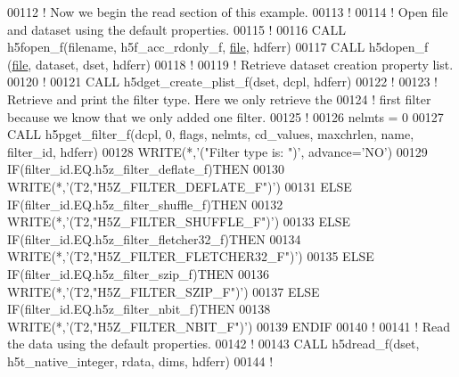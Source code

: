 \begin{DoxyCode}
00112   \textcolor{comment}{! Now we begin the read section of this example.}
00113   \textcolor{comment}{!}
00114   \textcolor{comment}{! Open file and dataset using the default properties.}
00115   \textcolor{comment}{!}
00116   \textcolor{keyword}{CALL }h5fopen\_f(filename, h5f\_acc\_rdonly\_f, \hyperlink{structfile}{file}, hdferr)
00117   \textcolor{keyword}{CALL }h5dopen\_f (\hyperlink{structfile}{file}, dataset, dset, hdferr)
00118   \textcolor{comment}{!}
00119   \textcolor{comment}{! Retrieve dataset creation property list.}
00120   \textcolor{comment}{!}
00121   \textcolor{keyword}{CALL }h5dget\_create\_plist\_f(dset, dcpl, hdferr)
00122   \textcolor{comment}{!}
00123   \textcolor{comment}{! Retrieve and print the filter type.  Here we only retrieve the}
00124   \textcolor{comment}{! first filter because we know that we only added one filter.}
00125   \textcolor{comment}{!}
00126   nelmts = 0
00127   \textcolor{keyword}{CALL }h5pget\_filter\_f(dcpl, 0, flags, nelmts, cd\_values, maxchrlen, name, filter\_id, hdferr)
00128   \textcolor{keyword}{WRITE}(*,\textcolor{stringliteral}{'("Filter type is: ")'}, advance=\textcolor{stringliteral}{'NO'})
00129   \textcolor{keywordflow}{IF}(filter\_id.EQ.h5z\_filter\_deflate\_f)\textcolor{keywordflow}{THEN}
00130      \textcolor{keyword}{WRITE}(*,\textcolor{stringliteral}{'(T2,"H5Z\_FILTER\_DEFLATE\_F")'})
00131   \textcolor{keywordflow}{ELSE} \textcolor{keywordflow}{IF}(filter\_id.EQ.h5z\_filter\_shuffle\_f)\textcolor{keywordflow}{THEN}
00132      \textcolor{keyword}{WRITE}(*,\textcolor{stringliteral}{'(T2,"H5Z\_FILTER\_SHUFFLE\_F")'})
00133   \textcolor{keywordflow}{ELSE} \textcolor{keywordflow}{IF}(filter\_id.EQ.h5z\_filter\_fletcher32\_f)\textcolor{keywordflow}{THEN}
00134      \textcolor{keyword}{WRITE}(*,\textcolor{stringliteral}{'(T2,"H5Z\_FILTER\_FLETCHER32\_F")'})
00135   \textcolor{keywordflow}{ELSE} \textcolor{keywordflow}{IF}(filter\_id.EQ.h5z\_filter\_szip\_f)\textcolor{keywordflow}{THEN}
00136      \textcolor{keyword}{WRITE}(*,\textcolor{stringliteral}{'(T2,"H5Z\_FILTER\_SZIP\_F")'})
00137   \textcolor{keywordflow}{ELSE} \textcolor{keywordflow}{IF}(filter\_id.EQ.h5z\_filter\_nbit\_f)\textcolor{keywordflow}{THEN}
00138      \textcolor{keyword}{WRITE}(*,\textcolor{stringliteral}{'(T2,"H5Z\_FILTER\_NBIT\_F")'})
00139 \textcolor{keywordflow}{  ENDIF}
00140   \textcolor{comment}{!}
00141   \textcolor{comment}{! Read the data using the default properties.}
00142   \textcolor{comment}{!}
00143   \textcolor{keyword}{CALL }h5dread\_f(dset, h5t\_native\_integer, rdata, dims, hdferr)
00144   \textcolor{comment}{!}

\end{DoxyCode}
